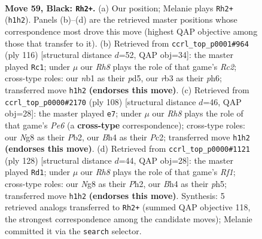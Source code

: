 \documentclass[11pt]{article}
\begin{document}
\clearpage

\begin{figure}[p]\centering
\begin{subfigure}{0.46\textwidth}\centering
\resizebox{\linewidth}{!}{%
\newchessgame
\chessboard[
  setfen={6n1/p6k/P6p/Rp3p2/1P2bP1b/1R6/4K3/1N5r b - - 9 59},
  showmover=false,
  pgfstyle=straightmove, color=movearrow, markmove={h1-h2}
]}
\caption{}
\end{subfigure}\hfill
\begin{subfigure}{0.46\textwidth}\centering
\resizebox{\linewidth}{!}{%
\newchessgame
\chessboard[
  setfen={8/2b5/2Pr3p/3p1p2/3k1p2/5B1P/2R2PP1/3K4 w - - 20 59},
  showmover=false,
  pgfstyle=straightmove, color=movearrow, markmove={c2-c1}
]}
\caption{}
\end{subfigure}
\\[4pt]
\begin{subfigure}{0.46\textwidth}\centering
\resizebox{\linewidth}{!}{%
\newchessgame
\chessboard[
  setfen={6r1/2R3p1/p3P3/Bp1k2rP/8/P7/KPP5/8 w - - 1 55},
  showmover=false,
  pgfstyle=straightmove, color=movearrow, markmove={e6-e7}
]}
\caption{}
\end{subfigure}\hfill
\begin{subfigure}{0.46\textwidth}\centering
\resizebox{\linewidth}{!}{%
\newchessgame
\chessboard[
  setfen={8/n2r1p1k/1p1P2p1/7p/P1B2P2/1P6/7P/5R1K w - - 1 65},
  showmover=false,
  pgfstyle=straightmove, color=movearrow, markmove={f1-d1}
]}
\caption{}
\end{subfigure}
\caption{\textbf{Move 59, Black: \texttt{Rh2+}.} (a) Our position; Melanie plays \texttt{Rh2+} (\texttt{h1h2}). Panels (b)--(d) are the retrieved master positions whose correspondence most drove this move (highest QAP objective among those that transfer to it). (b) Retrieved from \texttt{ccrl\_top\_p0001\#964} (ply 116) [structural distance $d$=52, QAP obj=34]: the master played \texttt{Rc1}; under $\mu$ our \emph{Rh8} plays the role of that game's \emph{Rc2}; cross-type roles: our \emph{n}b1 as their \emph{p}d5, our \emph{r}b3 as their \emph{p}h6; transferred move \texttt{h1h2} \textbf{(endorses this move)}. (c) Retrieved from \texttt{ccrl\_top\_p0000\#2170} (ply 108) [structural distance $d$=46, QAP obj=28]: the master played \texttt{e7}; under $\mu$ our \emph{Rh8} plays the role of that game's \emph{Pe6} (a \textbf{cross-type} correspondence); cross-type roles: our \emph{N}g8 as their \emph{P}b2, our \emph{B}h4 as their \emph{P}c2; transferred move \texttt{h1h2} \textbf{(endorses this move)}. (d) Retrieved from \texttt{ccrl\_top\_p0000\#1121} (ply 128) [structural distance $d$=44, QAP obj=28]: the master played \texttt{Rd1}; under $\mu$ our \emph{Rh8} plays the role of that game's \emph{Rf1}; cross-type roles: our \emph{N}g8 as their \emph{P}h2, our \emph{B}h4 as their \emph{p}h5; transferred move \texttt{h1h2} \textbf{(endorses this move)}. Synthesis: 5 retrieved analogs transferred to \texttt{Rh2+} (summed QAP objective 118, the strongest correspondence among the candidate moves); Melanie committed it via the \texttt{search} selector.}
\label{fig:thought-m117}
\end{figure}
\end{document}
